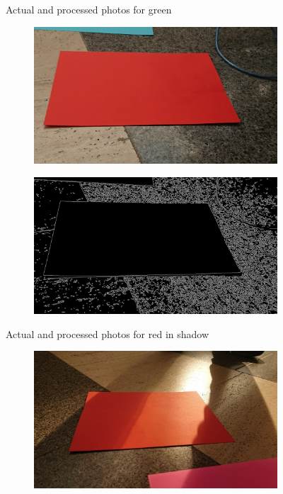 \documentclass[a4paper,12pt]{article}
\begin{document}
\begin{appendices}
\begin{figure}[H]
	\caption{\label{green} Actual and processed photos for green}
	\end{figure}
\begin{figure}[H]
	\centering
	\begin{subfigure}{.5\textwidth}
		\centering
		\includegraphics[width=.85\textwidth]{red-shadow.jpg}
	\end{subfigure}%
	\begin{subfigure}{.5\textwidth}
		\centering
		\includegraphics[width=.85\textwidth]{red-shadow-canny-processed-1.jpg}
	\end{subfigure}
	\caption{\label{redshadow} Actual and processed photos for red in shadow}
\end{figure}
\begin{figure}[H]
	\centering
	\begin{subfigure}{.5\textwidth}
		\centering
		\includegraphics[width=.9\textwidth]{red-light.jpg}

\end{subfigure}
\end{figure}
\end{appendices}
\end{document}
